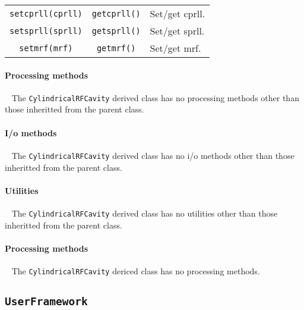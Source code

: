 \begin{table}[h]
\begin{center}
\begin{tabular}{|c|c|p{5cm}|}
      \texttt{setcprll(cprll)}              & \texttt{getcprll()}             & Set/get cprll.                     \\
      \texttt{setsprll(sprll)}              & \texttt{getsprll()}             & Set/get sprll.                     \\
      \texttt{setmrf(mrf)}                  & \texttt{getmrf()}              & Set/get mrf.                     \\
      \hline
    \end{tabular}
  \end{center}
\end{table}

\paragraph{Processing methods} ~\newline
\noindent
The \texttt{CylindricalRFCavity} derived class has no processing
methods other than those inheritted from the parent class.

\paragraph{I/o methods} ~\newline
\noindent
The \texttt{CylindricalRFCavity} derived class has no i/o methods other
than those inheritted from the parent class.

\paragraph{Utilities} ~\newline
\noindent
The \texttt{CylindricalRFCavity} derived class has no utilities other
than those inheritted from the parent class. 

\paragraph{Processing methods} ~\newline
\noindent
The \texttt{CylindricalRFCavity} dericed class has no processing methods.

\FloatBarrier

\subsection{\texttt{UserFramework}}
\label{SubSubSect:UsrFrmwrk}

